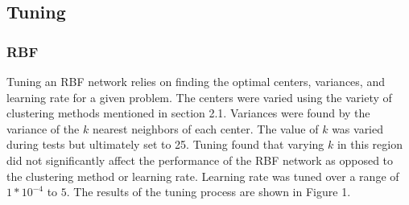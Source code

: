 \documentclass[twoside,11pt]{article}
\begin{document}
\subsection{Tuning}
\subsubsection{RBF}
Tuning an RBF network relies on finding the optimal centers, variances, and learning rate for a given problem. The centers were varied using the variety of clustering methods mentioned in section 2.1. Variances were found by the variance of the $k$ nearest neighbors of each center. The value of $k$ was varied during tests but ultimately set to 25. Tuning found that varying $k$ in this region did not significantly affect the performance of the RBF network as opposed to the clustering method or learning rate. Learning rate was tuned over a range of $1*10^{-4}$ to $5$. The results of the tuning process are shown in Figure 1. 
\end{document}
